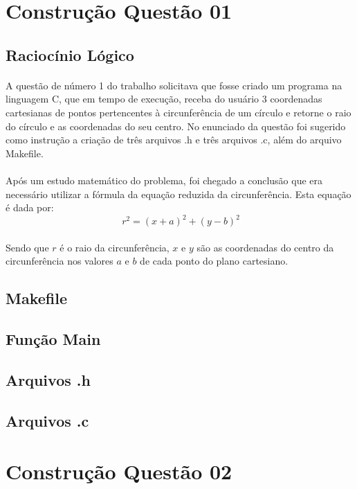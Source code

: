 \documentclass[11pt]{article}
\begin{document}
\section{Constru\c{c}\~ao Quest\~ao 01}
	\subsection{Racioc\'inio L\'ogico}
    	\paragraph{}	A quest\~ao de n\'umero 1 do trabalho solicitava que fosse criado um programa na linguagem C, que em tempo de execu\c{c}\~ao, receba do usu\'ario 3 coordenadas cartesianas de pontos pertencentes \`a circunfer\^encia de um c\'irculo e retorne o raio do c\'irculo e as coordenadas do seu centro. No enunciado da quest\~ao foi sugerido como instrução a cria\c{c}\~ao de tr\^es arquivos .h e tr\^es arquivos .c, al\'em do arquivo Makefile.
        \paragraph{}	Ap\'os um estudo matem\'atico do problema, foi chegado a conclus\~ao que era necess\'ario utilizar a f\'ormula da equa\c{c}\~ao reduzida da circunfer\^encia. Esta equa\c{c}\~ao \'e dada por:
         $$\ r^{2} = (x+a)^{2} + (y-b)^{2} $$
        \paragraph{}	Sendo que $r$ \'e o raio da circunfer\^encia, $x$ e $y$ s\~ao as coordenadas do centro da circunfer\^encia nos valores $a$ e $b$ de cada ponto do plano cartesiano. 	\subsection{Makefile}
	\subsection{Fun\c{c}\~ao Main}
	\subsection{Arquivos .h}
	\subsection{Arquivos .c}
\section{Constru\c{c}\~ao Quest\~ao 02}
\end{document}

